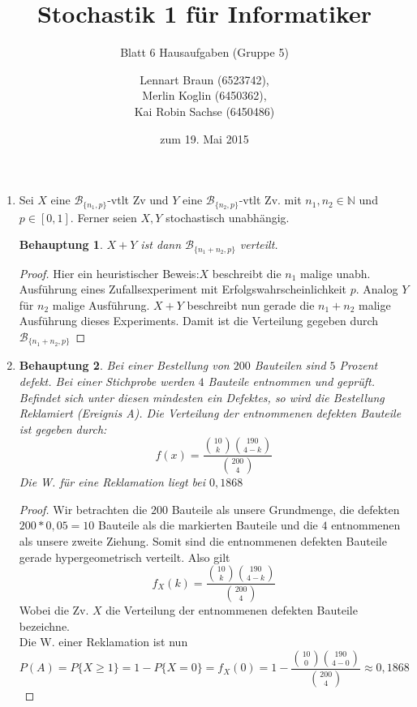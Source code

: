\documentclass[a4paper]{scrartcl}
\title{Stochastik 1 für Informatiker}
\subtitle{Blatt 6 Hausaufgaben (Gruppe 5)}
\author{
    Lennart Braun (6523742), \\
    Merlin Koglin (6450362), \\
    Kai Robin Sachse (6450486)
}
\date{zum 19. Mai 2015}
\newtheorem*{behaupt}{Behauptung}
\newcommand{\N}{\mathbb{N}}
\begin{document}
\maketitle

\begin{enumerate}[label=\bfseries\arabic*.]
    \item
        Sei $X$ eine $\mathcal{B}_{\{n_1,p\}}$-vtlt Zv und $Y$ eine
        $\mathcal{B}_{\{n_2,p\}}$-vtlt Zv. mit $n_1,n_2\in\N$ und
        $p\in [0,1]$. Ferner seien $X,Y$ stochastisch unabhängig.
        \begin{behaupt}
        	$X+Y$ ist dann $\mathcal{B}_{\{n_1+n_2,p\}}$ verteilt.
        \end{behaupt}
        \begin{proof}
            Hier ein heuristischer Beweis:$X$ beschreibt die $n_1$ malige unabh.
            Ausführung eines Zufallsexperiment mit Erfolgswahrscheinlichkeit $p$.
            Analog $Y$ für $n_2$ malige Ausführung. $X+Y$ beschreibt nun gerade
            die $n_1+n_2$ malige Ausführung dieses Experiments. Damit ist die
            Verteilung gegeben durch $\mathcal{B}_{\{n_1+n_2,p\}}$
        \end{proof}
        
    \item
    	\begin{behaupt}
    		Bei einer Bestellung von $200$ Bauteilen sind $5$ Prozent defekt.
    		Bei einer Stichprobe werden $4$ Bauteile entnommen und geprüft.
    		Befindet sich unter diesen mindesten ein Defektes, so wird die
    		Bestellung Reklamiert (Ereignis A). Die Verteilung der entnommenen
    		defekten Bauteile ist gegeben durch:
    		\[f(x)=\frac{ \binom{10}{k} \binom{190}{4-k} }{\binom{200}{4}}\]
    		Die W. für eine Reklamation liegt bei $0,1868$
    	\end{behaupt}
    	\begin{proof}
    		Wir betrachten die $200$ Bauteile als unsere Grundmenge, die defekten
    		$200*0,05=10$ Bauteile als die markierten Bauteile und die $4$
    		entnommenen als unsere zweite Ziehung. Somit sind die entnommenen
    		defekten Bauteile gerade hypergeometrisch verteilt. Also gilt
    		\[f_X(k)=\frac{\binom{10}{k}\binom{190}{4-k}}{\binom{200}{4}}\]
    		Wobei die Zv. $X$ die Verteilung der entnommenen defekten Bauteile
    		bezeichne.\\
    		Die W. einer Reklamation ist nun
    		\[P(A)=P\{X\ge 1\}=1-P\{X=0\}=f_X(0)=1-\frac{\binom{10}{0}
    		\binom{190}{4-0}}{\binom{200}{4}}\approx 0,1868\]
    	\end{proof}
    	

\end{enumerate}
\end{document}
